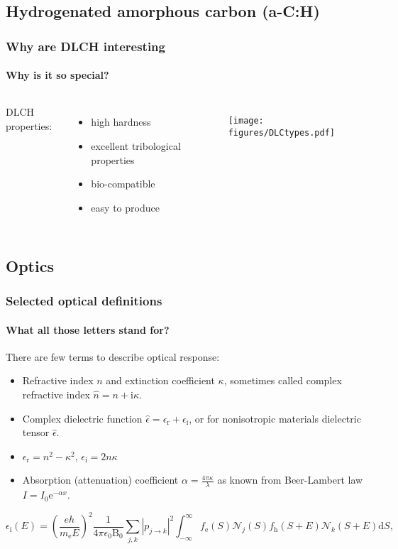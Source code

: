 \documentclass{beamer}
\begin{document}
\subsection{Hydrogenated amorphous carbon (a-C:H)}
\begin{frame}
    \frametitle{Why are DLCH interesting}
    \framesubtitle{Why is it so special?}
	\begin{columns}[c]
	DLCH properties:
	\begin{itemize}
	\item high hardness
	\item excellent tribological properties
	\item bio-compatible
	\item easy to produce
	\end{itemize}

    \begin{figure}
	\texttt{[image: figures/DLCtypes.pdf]}
	\end{figure}

	\end{columns}
\end{frame}

\subsection{Optics}
\begin{frame}
    \frametitle{Selected optical definitions}
    \framesubtitle{What all those letters stand for?}

	There are few terms to describe optical response:

	\begin{itemize}
	\item Refractive index $n$ and extinction coefficient $\kappa$, sometimes called complex refractive index $\hat{n} = n + \mathrm{i} \kappa$.
	\item Complex dielectric function $\hat{\epsilon} = \epsilon_\mathrm{r} + \epsilon_\mathrm{i}$, or for nonisotropic materials dielectric tensor $\hat{\epsilon}$.
	\item $\epsilon_\mathrm{r} = n^2 - \kappa^2 $, $\epsilon_\mathrm{i} = 2 n \kappa$
	\item Absorption (attenuation) coefficient $\alpha = \frac{4 \pi \kappa}{\lambda}$ as known from Beer-Lambert law $I = I_0 \mathrm{e}^{-\alpha x}$.
	\end{itemize} 
	\small
	\begin{equation}	
	\epsilon_\mathrm{i} (E) = 
\left(\frac{eh}{m_\mathrm{e}E} \right)^2 \frac{1}{4 \pi \epsilon_0 \mathrm{B}_0} \sum_{j,k} | p_{j \rightarrow k} |^2
\int_{-\infty}^\infty f_\mathrm{e}(S) \mathcal{N}_j(S) f_\mathrm{h}(S+E) \mathcal{N}_k(S + E)\mathrm{d}S \text{,}
	\end{equation}
	\normalsize
\end{frame}
\end{document}
